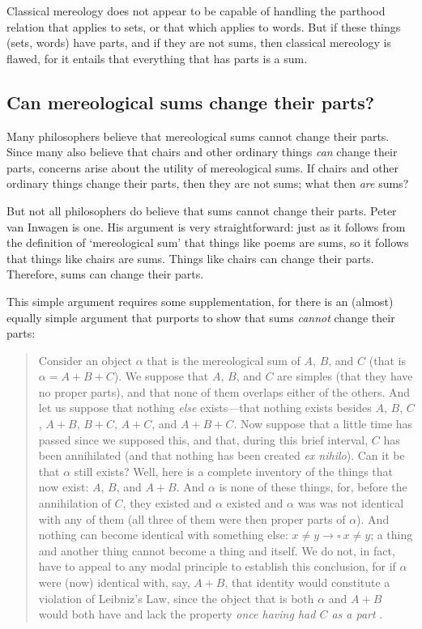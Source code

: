 \documentclass[12pt,twoside]{reedfancy}
\begin{document}
\begin{spacing}{1.25}
Classical mereology does not appear to be capable of handling the
parthood relation that applies to sets, or that which applies to
words.  But if these things (sets, words) have parts, and if they are
not sums, then classical mereology is flawed, for it entails that
everything that has parts is a sum.

\subsection{Can mereological sums change their parts?}
\label{change}
Many philosophers believe that mereological sums cannot change their
parts.  Since many also believe that chairs and other ordinary things
{\em can} change their parts, concerns arise about the utility of
mereological sums.  If chairs and other ordinary things change their
parts, then they are not sums; what then {\em are} sums?

But not all philosophers do believe that sums cannot change their
parts.  Peter van Inwagen is one.  His argument is very
straightforward:  just as it follows from the definition of
`mereological sum' that things like poems are sums, so it follows that
things like chairs are sums.  Things like chairs can change their
parts.  Therefore, sums can change their parts.

This simple argument requires some supplementation, for there is an
(almost) equally simple argument that purports to show that sums {\em
  cannot} change their parts:

\begin{quote}
Consider an object $\alpha$ that is the mereological sum of $A$, $B$,
and $C$ (that is $\alpha = A + B + C$).  We suppose that $A$, $B$, and
$C$ are simples (that they have no proper parts), and that none of
them overlaps either of the others.  And let us suppose that nothing
{\em else} exists---that nothing exists besides $A$, $B$, $C$, $A +
B$, $B + C$, $A + C$, and $A + B + C$.  Now suppose that a little time
has passed since we supposed this, and that, during this brief
interval, $C$ has been annihilated (and that nothing has been created
{\em ex nihilo}).  Can it be that $\alpha$ still exists?  Well, here
is a complete inventory of the things that now exist: $A$, $B$, and $A
+ B$.  And $\alpha$ is none of these things, for, before the
annihilation of $C$, they existed and $\alpha$ existed and $\alpha$
was was not identical with any of them (all three of them were then
proper parts of $\alpha$).  And nothing can become identical with
something else: $x \neq y \rightarrow \square\ x \neq y$; a thing and
another thing cannot become a thing and itself.  We do not, in fact,
have to appeal to any modal principle to establish this conclusion,
for if $\alpha$ were (now) identical with, say, $A + B$, that identity
would constitute a violation of Leibniz's Law, since the object that
is both $\alpha$ and $A + B$ would both have and lack the property
{\em once having had $C$ as a part} \citep[628]{inwagen2006}.
\end{quote}


\end{spacing}
\end{document}

